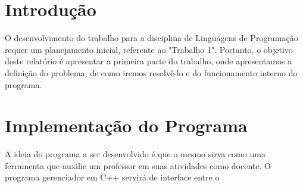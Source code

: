 \documentclass[12pt,a4paper]{article}
\begin{document}
%
%

\cleardoublepage
\section{Introdução}

O desenvolvimento do trabalho para a disciplina de Linguagens de Programação requer um planejamento inicial, referente ao "Trabalho 1". Portanto, o objetivo deste relatório é apresentar a primeira parte do trabalho, onde apresentamos a definição do problema, de como iremos resolvê-lo e do funcionamento interno do programa.


\section{Implementação do Programa}

A ideia do programa a ser desenvolvido é que o mesmo sirva como uma ferramenta que auxilie um professor em suas atividades como docente. O programa gerenciador em C++ servirá de interface entre o  




\end{document}
